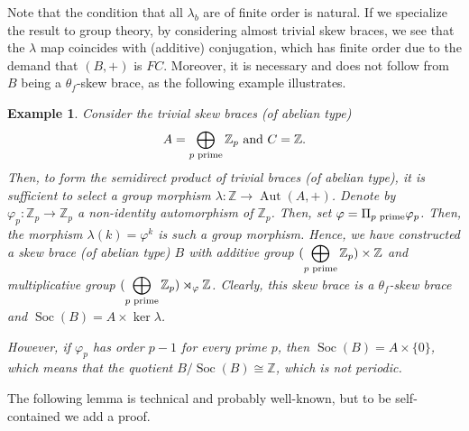 \documentclass{amsart}
\newcommand{\Aut}{\operatorname{Aut}}
\newcommand{\Soc}{\operatorname{Soc}}
\newtheorem{exa}[thm]{Example}
\begin{document}
Note that the condition that all $\lambda_b$ are of finite order is natural. If we specialize the result to group theory, by considering almost trivial skew braces, we see that the $\lambda$ map coincides with (additive) conjugation, which has finite order due to the demand that $(B,+)$ is $FC$. Moreover, it is necessary and 
does not follow from $B$ being a $\theta_f$-skew brace, as the following example illustrates.

\begin{exa}\label{notfg}
    Consider the trivial skew braces (of abelian type)
    $$A= \bigoplus_{p \textnormal{ prime}}\mathbb{Z}_p \textnormal{ and }C= \mathbb{Z}.$$
    Then, to form the semidirect product of trivial braces (of abelian type),
    it is sufficient to select a group morphism $ \lambda\colon \mathbb{Z} \rightarrow \Aut(A,+)$.
    Denote by $\varphi_p\colon \mathbb{Z}_p \rightarrow \mathbb{Z}_p$
    a non-identity automorphism of $\mathbb{Z}_p$. 
    Then, set $\varphi = \Pi_{p \textnormal{ prime}}\varphi_p$. 
    Then, the morphism $\lambda(k)=\varphi^k$ is such a group morphism. 
    Hence, we have constructed a skew brace (of abelian type) $B$
    with additive group $(\displaystyle\bigoplus_{p \textnormal{ prime}}\mathbb{Z}_p)\times \mathbb{Z}$
    and multiplicative group $(\displaystyle\bigoplus_{p \textnormal{ prime}}\mathbb{Z}_p) \rtimes_{\varphi} \mathbb{Z}$.
    Clearly, this skew brace is a $\theta_f$-skew brace
    and $\Soc(B)=A\times \ker\lambda$.
    
    However, if $\varphi_p$  has order $p-1$
    for every prime $p$, then
    $\Soc(B)=A\times\{0\}$,
    which means that the quotient $B/\Soc(B) \cong \mathbb{Z}$, which is not periodic.
\end{exa}
The following lemma is technical and probably well-known, but to be self-contained we add a proof.
\end{document}
